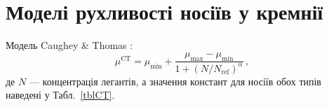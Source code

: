 \documentclass[fleqn,twoside,twocolumn,nofootinbib,showkeys]{revtex4} %
\begin{document}
\section{Моделі рухливості носіїв у кремнії}\label{App2}

Модель   Caughey \& Thomas \cite{Caughey1967}:
\begin{equation}\label{eqCT}
  \mu^\mathrm{CT}=\mu_\mathrm{min}+\frac{\mu_\mathrm{max}-\mu_\mathrm{min}}{1+(N/N_\mathrm{ref})^\alpha}\,,
\end{equation}
де
$N$ --- концентрація легантів,
а значення констант для носіїв обох типів наведені у Табл.~\ref{tblCT}.

\begin{table}
\caption{Коефіцієнти для розрахунку рухливості відповідно до моделі Caughey--Thomas (\ref{eqCT})}
\label{tblCT}
\vspace{2mm}
\centering
{}
\end{table}
\end{document}
